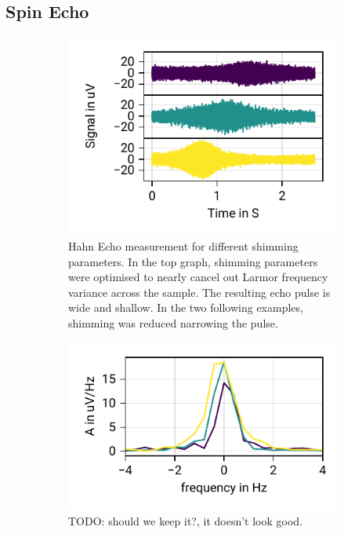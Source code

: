 \documentclass[
    parskip=half, 
    twoside=false,
    twocolumn=true,
    fontsize=11pt,
]{scrarticle}
\begin{document}
\subsection{Spin Echo}
\begin{figure}
    \begin{subfigure}{.5\textwidth}
        \centering
        \includegraphics{figures/04 spin echo shims.pdf}
        \caption{Hahn Echo measurement for different shimming parameters. In the top graph, shimming parameters were optimised to nearly cancel out Larmor frequency variance across the sample. The resulting echo pulse is wide and shallow. In the two following examples, shimming was reduced narrowing the pulse.}
        \label{fig:hahn}        
    \end{subfigure}
    \begin{subfigure}{.5\textwidth}
        \centering
        \includegraphics{figures/04 spin echo shims spectrum.pdf}
        \caption{TODO: should we keep it?, it doesn't look good.}
    \end{subfigure}
    \caption{}
 \end{figure}
\end{document}
